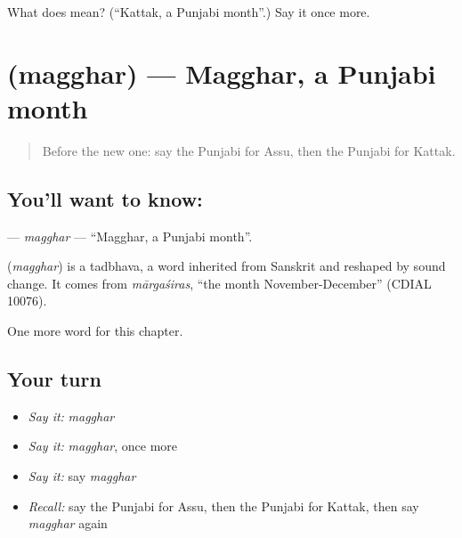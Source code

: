 \begin{tcolorbox}[breakable,colback=teal!4,colframe=teal!35!black,title={Before you move on}]
What does  mean? (\textquotedblleft{}Kattak, a Punjabi month\textquotedblright{}.) Say it once more.
\end{tcolorbox}
\section[\texorpdfstring{\pa{ਮੱਘਰ} (magghar)}{ਮੱਘਰ (magghar)}]{ (magghar) — Magghar, a Punjabi month}

\label{lesson:PA-C105-magghar}



\begin{quote}
Before the new one: say the Punjabi for Assu, then the Punjabi for Kattak.
\end{quote}

\subsection*{You'll want to know: }
\textbf{} — \emph{magghar} — \textquotedblleft{}Magghar, a Punjabi month\textquotedblright{}.

\begin{cousinweb}
\textbf{} (\emph{magghar}) is a tadbhava, a word inherited from Sanskrit and reshaped by sound change. It comes from \emph{mārgaśiras}, \textquotedblleft{}the month November-December\textquotedblright{} (CDIAL 10076).
\end{cousinweb}

\begin{grammarlens}[title={What you've built}]
One more word for this chapter.
\end{grammarlens}

\subsection*{Your turn}
\begin{itemize}
\raggedright
  \item \emph{Say it:} \emph{magghar}
  \item \emph{Say it:} \emph{magghar}, once more
  \item \emph{Say it:} say \emph{magghar}
  \item \emph{Recall:} say the Punjabi for Assu, then the Punjabi for Kattak, then say \emph{magghar} again
\end{itemize}

